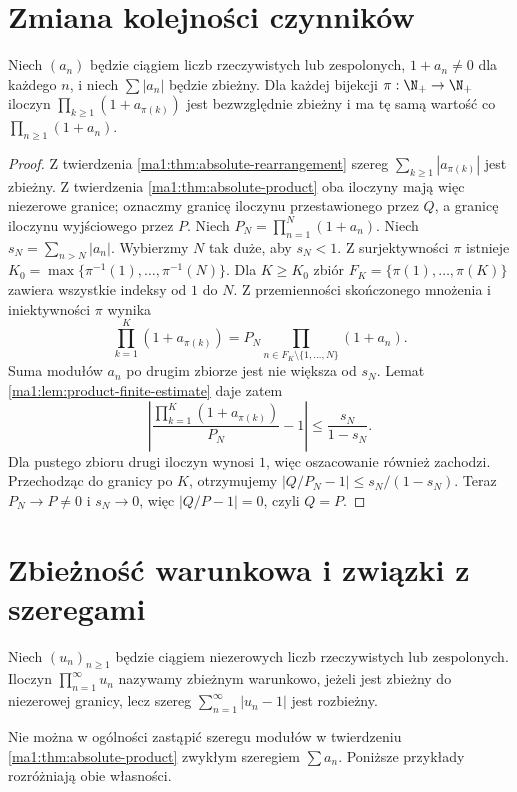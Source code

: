 \section{Zmiana kolejności czynników}
\begin{twierdzenie}
\label{ma1:thm:product-rearrangement}
Niech $(a_n)$ będzie ciągiem liczb rzeczywistych lub zespolonych, $1+a_n\ne0$ dla każdego $n$, i niech $\sum|a_n|$ będzie zbieżny. Dla każdej bijekcji $\pi:\N_+\to\N_+$ iloczyn $\prod_{k\ge1}(1+a_{\pi(k)})$ jest bezwzględnie zbieżny i ma tę samą wartość co $\prod_{n\ge1}(1+a_n)$.
\end{twierdzenie}
\begin{proof}
Z twierdzenia \ref{ma1:thm:absolute-rearrangement} szereg $\sum_{k\ge1}|a_{\pi(k)}|$ jest zbieżny. Z twierdzenia \ref{ma1:thm:absolute-product} oba iloczyny mają więc niezerowe granice; oznaczmy granicę iloczynu przestawionego przez $Q$, a granicę iloczynu wyjściowego przez $P$. Niech $P_N=\prod_{n=1}^N(1+a_n)$.
Niech $s_N=\sum_{n>N}|a_n|$. Wybierzmy $N$ tak duże, aby $s_N<1$. Z surjektywności $\pi$ istnieje $K_0=\max\{\pi^{-1}(1),\ldots,\pi^{-1}(N)\}$. Dla $K\ge K_0$ zbiór $F_K=\{\pi(1),\ldots,\pi(K)\}$ zawiera wszystkie indeksy od $1$ do $N$. Z przemienności skończonego mnożenia i iniektywności $\pi$ wynika
\[
 \prod_{k=1}^K(1+a_{\pi(k)})
 =P_N\prod_{n\in F_K\setminus\{1,\ldots,N\}}(1+a_n).
\]
Suma modułów $a_n$ po drugim zbiorze jest nie większa od $s_N$. Lemat \ref{ma1:lem:product-finite-estimate} daje zatem
\[
 \left|\frac{\prod_{k=1}^K(1+a_{\pi(k)})}{P_N}-1\right|
 \le\frac{s_N}{1-s_N}.
\]
Dla pustego zbioru drugi iloczyn wynosi $1$, więc oszacowanie również zachodzi. Przechodząc do granicy po $K$, otrzymujemy $|Q/P_N-1|\le s_N/(1-s_N)$. Teraz $P_N\to P\ne0$ i $s_N\to0$, więc $|Q/P-1|=0$, czyli $Q=P$.
\end{proof}

\section{Zbieżność warunkowa i związki z szeregami}
\begin{definicja}
\label{ma1:def:conditional-product}
Niech $(u_n)_{n\ge1}$ będzie ciągiem niezerowych liczb rzeczywistych lub zespolonych. Iloczyn $\prod_{n=1}^\infty u_n$ nazywamy zbieżnym warunkowo, jeżeli jest zbieżny do niezerowej granicy, lecz szereg $\sum_{n=1}^\infty|u_n-1|$ jest rozbieżny.
\end{definicja}
Nie można w ogólności zastąpić szeregu modułów w twierdzeniu \ref{ma1:thm:absolute-product} zwykłym szeregiem $\sum a_n$. Poniższe przykłady rozróżniają obie własności.

